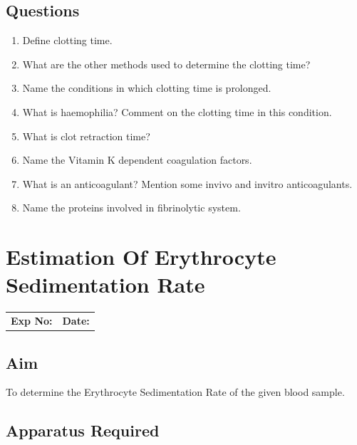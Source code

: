 \documentclass[a4paper,12pt]{book}
\begin{document}
											\section*{Questions}
											\begin{enumerate}
												\item{Define clotting time.}
												\item{What are the other methods used to determine the clotting time?}
												\item{Name the conditions in which clotting time is prolonged.}
												\item{What is haemophilia? Comment on the clotting time in this condition.}
												\item{What is clot retraction time?}
												\item{Name the Vitamin K dependent coagulation factors.}
												\item{What is an anticoagulant? Mention some invivo and invitro anticoagulants.}
												\item{Name the proteins involved in fibrinolytic system.}
											\end{enumerate}

											\chapter*{\centering Estimation Of Erythrocyte Sedimentation Rate}
											\begin{tabular}{p{5in} p{1in}}
												\textbf{Exp No:}  & \textbf{Date:}\\
											\end{tabular}
											\section*{Aim}
											To determine the Erythrocyte Sedimentation Rate of the given blood sample.
											\section*{Apparatus Required}
\end{document}

